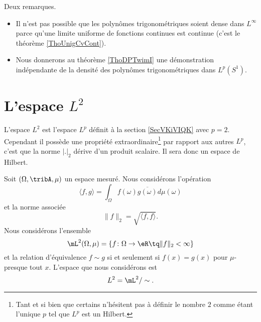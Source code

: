 \begin{remark}
    Deux remarques.
    \begin{itemize}
        \item 
            Il n'est pas possible que les polynômes trigonométriques soient dense dans \( L^{\infty}\) parce qu'une limite uniforme de fonctions continues est continue (c'est le théorème \ref{ThoUnigCvCont}).
        \item 
            Nous donnerons au théorème \ref{ThoDPTwimI} une démonstration indépendante de la densité des polynômes trigonométriques dans \( L^p(S^1)\).
    \end{itemize}
\end{remark}

\section{L'espace \texorpdfstring{$L^2$}{$L^2$}}
\label{SecCKZSrZK}

L'espace \( L^2\) est l'espace \( L^p\) définit à la section \ref{SecVKiVIQK} avec \( p=2\). Cependant il possède une propriété extraordinaire\footnote{Tant et si bien que certains n'hésitent pas à définir le nombre \( 2\) comme étant l'unique \( p\) tel que \( L^p\) est un Hilbert.} par rapport aux autres \( L^p\), c'est que la norme \( | . |_2\) dérive d'un produit scalaire. Il sera donc un espace de Hilbert.

Soit \( (\Omega,\tribA,\mu)\) un espace mesuré. Nous considérons l'opération
\begin{equation}    \label{DefProdScalLubrgTj}
    \langle f, g\rangle =\int_{\Omega}f(\omega)\overline{ g(\omega)}d\mu(\omega)
\end{equation}
et la norme associée
\begin{equation}
    \| f \|_2=\sqrt{\langle f, f\rangle }.
\end{equation}
Nous considérons l'ensemble
\begin{equation}
    \mL^2(\Omega,\mu)=\{ f\colon \Omega\to \eR\tq \| f \|_2<\infty \}
\end{equation}
et la relation d'équivalence \( f\sim g\) si et seulement si \( f(x)=g(x)\) pour \( \mu\)-presque tout \( x\). L'espace que nous considérons est
\begin{equation}
    L^2=\mL^2/\sim.
\end{equation}

